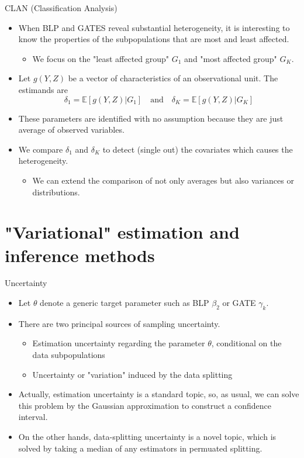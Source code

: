 \documentclass[xcolor=svgnames,aspectratio=169]{beamer}
\newcommand{\E}{\mathbb{E}}
\begin{document}
\begin{frame}{CLAN (Classification Analysis)}
    \begin{itemize}
        \item When BLP and GATES reveal substantial heterogeneity, it is interesting to know \alert{the properties of the subpopulations} that are most and least affected.
        \begin{itemize}
            \item We focus on the "least affected group" $G_1$ and "most affected group" $G_K$.
        \end{itemize}
        \item Let $g(Y,Z)$ be a vector of characteristics of an observational unit. The estimands are 
        \[
        \delta_1=\E[g(Y,Z)|G_1]\quad \text{and}\quad\delta_K=\E[g(Y,Z)|G_K]
        \]
        \item These parameters are identified with no assumption because they are just average of observed variables.
        \item We compare $\delta_1$ and $\delta_K$ to detect (single out) the covariates which causes the heterogeneity.
        \begin{itemize}
            \item We can extend the comparison of not only averages but also variances or distributions.
        \end{itemize}
    \end{itemize}
\end{frame}

\section{"Variational" estimation and inference methods}

\begin{frame}{Uncertainty}
    \begin{itemize}
        \item Let $\theta$ denote a generic target parameter such as BLP $\beta_2$ or GATE $\gamma_k$.
        \item There are two principal sources of sampling uncertainty.
        \begin{itemize}
            \item \alert{Estimation uncertainty} regarding the parameter $\theta$, conditional on the data subpopulations
            \item Uncertainty or "variation" \alert{induced by the data splitting}
        \end{itemize}
        \item Actually, estimation uncertainty is a standard topic, so, as usual, we can solve this problem by the \alert{Gaussian approximation} to construct a confidence interval.
        \item On the other hands, data-splitting uncertainty is a novel topic, which is solved by taking a \alert{median} of any estimators in permuated splitting. 
    \end{itemize}
\end{frame}
\end{document}
